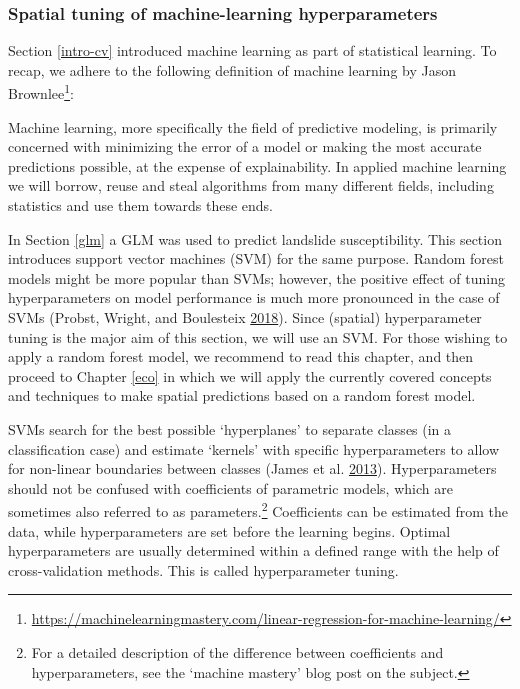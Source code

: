 \documentclass[]{krantz}
\let\rmarkdownfootnote\footnote%
\def\footnote{\protect\rmarkdownfootnote}
\renewenvironment{quote}{\begin{VF}}{\end{VF}}
\renewcommand{\href}[2]{#2\footnote{\url{#1}}}
\begin{document}
\hypertarget{svm}{%
\subsubsection{Spatial tuning of machine-learning hyperparameters}\label{svm}}

Section \ref{intro-cv} introduced machine learning as part of statistical learning.
To recap, we adhere to the following definition of machine learning by \href{https://machinelearningmastery.com/linear-regression-for-machine-learning/}{Jason Brownlee}:

\begin{quote}
Machine learning, more specifically the field of predictive modeling, is primarily concerned with minimizing the error of a model or making the most accurate predictions possible, at the expense of explainability.
In applied machine learning we will borrow, reuse and steal algorithms from many different fields, including statistics and use them towards these ends.
\end{quote}

In Section \ref{glm} a GLM was used to predict landslide susceptibility.
This section introduces support vector machines (SVM) for the same purpose.
Random forest models might be more popular than SVMs; however, the positive effect of tuning hyperparameters on model performance is much more pronounced in the case of SVMs (Probst, Wright, and Boulesteix \protect\hyperlink{ref-probst_hyperparameters_2018}{2018}).
Since (spatial) hyperparameter tuning is the major aim of this section, we will use an SVM.
For those wishing to apply a random forest model, we recommend to read this chapter, and then proceed to Chapter \ref{eco} in which we will apply the currently covered concepts and techniques to make spatial predictions based on a random forest model.

SVMs search for the best possible `hyperplanes' to separate classes (in a classification case) and estimate `kernels' with specific hyperparameters to allow for non-linear boundaries between classes (James et al. \protect\hyperlink{ref-james_introduction_2013}{2013}).
Hyperparameters should not be confused with coefficients of parametric models, which are sometimes also referred to as parameters.\footnote{For a detailed description of the difference between coefficients and hyperparameters, see the `machine mastery' blog post on the subject.}
Coefficients can be estimated from the data, while hyperparameters are set before the learning begins.
Optimal hyperparameters are usually determined within a defined range with the help of cross-validation methods.
This is called hyperparameter tuning.
\end{document}
